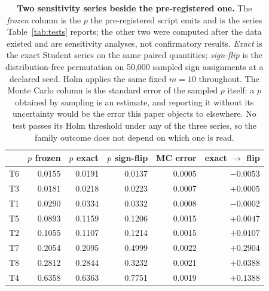\begin{table}[h]
\centering
\caption{\textbf{Two sensitivity series beside the pre-registered one.} The \emph{frozen} column is the $p$ the pre-registered script emits and is the series Table~\ref{tab:tests} reports; the other two were computed after the data existed and are sensitivity analyses, not confirmatory results. \emph{Exact} is the exact Student series on the same paired quantities; \emph{sign-flip} is the distribution-free permutation on 50{,}000 sampled sign assignments at a declared seed. Holm applies the same fixed $m{=}10$ throughout. The Monte Carlo column is the standard error of the sampled $p$ itself: a $p$ obtained by sampling is an estimate, and reporting it without its uncertainty would be the error this paper objects to elsewhere. No test passes its Holm threshold under any of the three series, so the family outcome does not depend on which one is read.}
\label{tab:permutazione}
\footnotesize
\setlength{\tabcolsep}{4pt}
\begin{tabular}{@{}lrrrrr@{}}
\toprule
& $p$ frozen & $p$ exact & $p$ sign-flip & MC error & exact $\rightarrow$ flip \\
\midrule
T6 & 0.0155 & 0.0191 & 0.0137 & 0.0005 & $-0.0053$ \\
T3 & 0.0181 & 0.0218 & 0.0223 & 0.0007 & $+0.0005$ \\
T1 & 0.0290 & 0.0334 & 0.0332 & 0.0008 & $-0.0002$ \\
T5 & 0.0893 & 0.1159 & 0.1206 & 0.0015 & $+0.0047$ \\
T2 & 0.1055 & 0.1107 & 0.1214 & 0.0015 & $+0.0107$ \\
T7 & 0.2054 & 0.2095 & 0.4999 & 0.0022 & $+0.2904$ \\
T8 & 0.2812 & 0.2844 & 0.3232 & 0.0021 & $+0.0388$ \\
T4 & 0.6358 & 0.6363 & 0.7751 & 0.0019 & $+0.1388$ \\
\bottomrule
\end{tabular}
\end{table}
